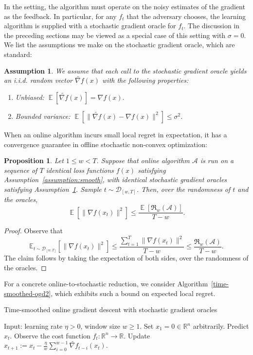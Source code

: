 \documentclass{article}
\def\reals{{\mathbb R}}
\def\norm#1{\mathopen\| #1 \mathclose\|}
\def\reals{{\mathbb R}}
\newcommand{\bra}[1]{\left[#1\right]}
\DeclareMathOperator*{\E}{\mathbb{E}}
\newtheorem{proposition}[theorem]{Proposition}
\newcommand{\Acal}{\mathcal{A}}
\newcommand{\regret}{\mathfrak{R}}
\newtheorem{assumption}[theorem]{Assumption}
\begin{document}
In the setting, the algorithm must operate on the noisy estimates of the gradient as the feedback. In particular, for any $f_t$ that the adversary chooses, the learning algorithm is supplied with a stochastic gradient oracle for $f_t$. The discussion in the preceding sections may be viewed as a special case of this setting with $\sigma=0$. We list the assumptions we make on the stochastic gradient oracle, which are standard:
\begin{assumption}
\label{u1}
We assume that each call to the stochastic gradient oracle yields an i.i.d. random vector $\widetilde{\nabla f}(x)$ with the following properties:
\begin{enumerate}
\item[(i)] Unbiased: $\E \bra{ \widetilde{\nabla f}(x) } = \nabla f(x).$
\item[(ii)] Bounded variance: $\E\bra{\norm{ \widetilde{\nabla f}(x) - \nabla f(x) }^2} \leq \sigma^2.$
\end{enumerate}
\end{assumption}

When an online algorithm incurs small local regret in expectation, it has a convergence guarantee in offline stochastic non-convex optimization:
\begin{proposition}
\label{prop:online-implies-stochastic}
Let $1 \leq w < T$. Suppose that online algorithm $\Acal$ is run on a sequence of $T$ identical loss functions $f(x)$ satisfying Assumption~\ref{assumption:smooth}, with identical stochastic gradient oracles satisfying Assumption~\ref{u1}. Sample $t \sim \mathcal{D}_{[w,T]}$. Then, over the randomness of $t$ and the oracles,
\begin{equation*}
\E \bra{ \norm{ \nabla f(x_t) }^2 }  \leq  \frac{\E\bra{\regret_w(\Acal)}}{T-w}.
\end{equation*}
\end{proposition}
\begin{proof}
Observe that
\[
\mathbb{E}_{t\sim \mathcal{D}_{[w,T]}} \bra{ \norm{\nabla f(x_t)}^2 } \leq \frac{ \sum_{t=1}^T \|\nabla f(x_t)\|^2 }{T-w} \leq \frac{\regret_w(\Acal)}{T-w}.
\]
The claim follows by taking the expectation of both sides, over the randomness of the oracles.
\end{proof}

For a concrete online-to-stochastic reduction, we consider Algorithm~\ref{time-smoothed-ogd2}, which exhibits such a bound on expected local regret.
\begin{algorithm}
\caption{Time-smoothed online gradient descent with stochastic gradient oracles}
\label{time-smoothed-ogd2}
\begin{algorithmic}[1]
\STATE Input: learning rate $\eta > 0$, window size $w \geq 1$.
\STATE Set $x_1=0\in\mathbb{R}^n$ arbitrarily.
\STATE Predict $x_t$. Observe the cost function $f_t:\reals^n\to \reals$.
\STATE Update $x_{t+1} := x_t - \frac{\eta}{w} \sum_{i=0}^{w - 1} \widetilde{\nabla f}_{t - i}(x_t)$.
\ENDFOR
\end{algorithmic}
\end{algorithm}
\end{document}

